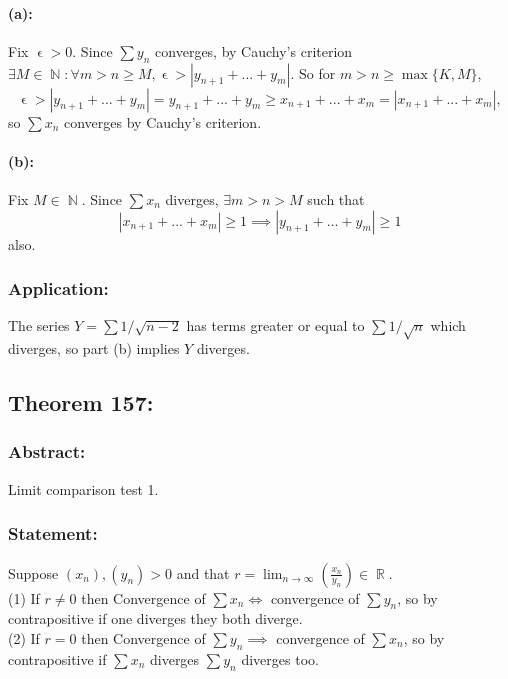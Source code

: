 \documentclass{article}
\DeclareMathOperator\eps{\epsilon}
\DeclareMathOperator\R{\mathbb{R}}
\DeclareMathOperator\N{\mathbb{N}}
\begin{document}
\paragraph{(a):} Fix $\eps>0$. Since $\sum y_n$ converges, by Cauchy's criterion
$\exists M \in \N: \forall m>n \geq M, \eps > |y_{n+1}+...+y_{m}|$. So for $m>n \geq \max \{K,M \}$,
$$\eps > |y_{n+1}+...+y_{m}|= y_{n+1}+...+y_{m} \geq x_{n+1}+...+x_{m} = |x_{n+1}+...+x_{m}|,$$
so $\sum x_n$ converges by Cauchy's criterion.
\paragraph{(b):}
Fix $M \in \N$. Since $\sum x_n$ diverges, $\exists m>n>M$ such that $$
|x_{n+1}+...+x_{m}| \geq 1 \implies |y_{n+1}+...+y_{m}| \geq 1
$$
also.
\subsubsection*{Application:}
The series $Y = \sum 1 \slash \sqrt{n-2}$ has terms greater or equal to
$\sum 1 \slash \sqrt{n}$ which diverges, so part (b) implies $Y$ diverges.
\subsection{Theorem 157:}
\subsubsection*{Abstract:}
Limit comparison test 1.
\subsubsection*{Statement:}
Suppose $(x_n),(y_n)>0$ and that $r =
\lim_{n \to \infty}(\frac{x_n}{y_n}) \in \R$. \\
\newline
(1) If $r \neq 0$ then Convergence of $\sum x_n \iff$ convergence of $\sum y_n$,
so by contrapositive if one diverges they both diverge.
\\
\newline
(2) If $r = 0$ then Convergence of $\sum y_n \implies$ convergence of $\sum x_n$, so
by contrapositive if $\sum x_n$ diverges $\sum y_n$ diverges too.
\end{document}
